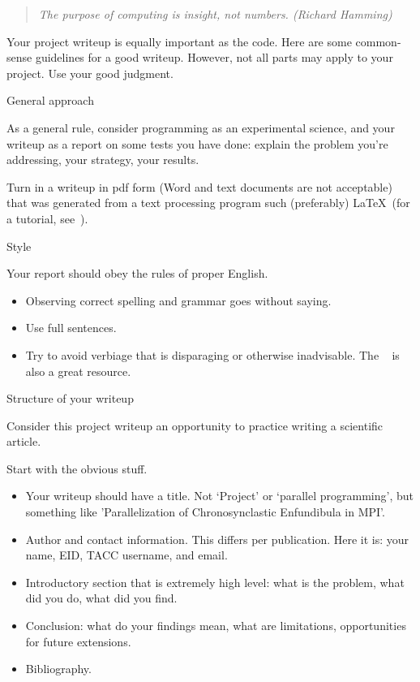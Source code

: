 
\begin{quote}
  \textsl{The purpose of computing is insight, not numbers. (Richard Hamming)}
\end{quote}

Your project writeup is equally important as the code.
Here are
some common-sense guidelines for a good writeup. However, not all
parts may apply to your project.
Use your good judgment.

 {General approach}

As a general rule, consider programming as an experimental science,
and your writeup as a report on some tests you have done: explain
the problem you're addressing, your strategy, your results.

Turn in a writeup in pdf form (Word and text documents are not acceptable)
that was generated from a text processing program such 
(preferably) \LaTeX\ (for a tutorial, see~).

 {Style}

Your report should obey the rules of proper English.
\begin{itemize}
\item Observing correct spelling and grammar goes without saying.
\item Use full sentences.
\item Try to avoid verbiage that is disparaging
  or otherwise inadvisable.
  The
  ~\cite{googlestyle}
  is also a great resource.
\end{itemize}

 {Structure of your writeup}

Consider this project writeup an opportunity to practice writing a scientific article.

Start with the obvious stuff.
\begin{itemize}
\item Your writeup should have a title. Not `Project' or `parallel programming',
  but something like 'Parallelization of Chronosynclastic Enfundibula in MPI'.
\item Author and contact information. This differs per publication.
  Here it is: your name, EID, TACC username, and email.
\item Introductory section that is extremely high level: what is the problem,
  what did you do, what did you find.
\item Conclusion: what do your findings mean, what are limitations, opportunities
  for future extensions.
\item Bibliography.
\end{itemize}


